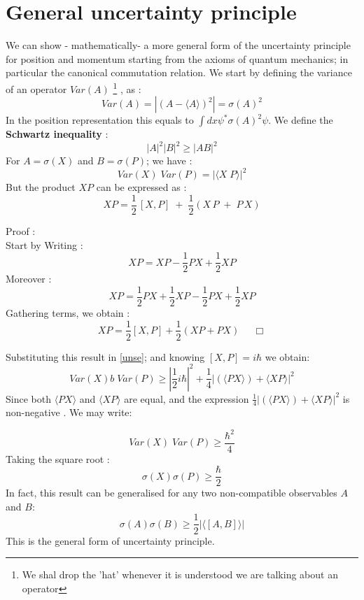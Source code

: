   \section{General uncertainty principle}
  We can show - mathematically- a more general form of the uncertainty principle for position and momentum starting from the axioms of quantum mechanics; in particular the canonical commutation relation. 
  We start by defining the variance of an operator $ Var(A)$ \footnote{ We shal drop the 'hat' whenever it is understood we are talking about an operator} , as :
  \begin{equation}
  Var(A) = |(A- \langle A\rangle)^2| = \sigma(A)^2
  \end{equation}
  In the position representation this equals to $ \int dx \psi^*  \sigma(A)^2 \psi $. We define the \textbf{Schwartz inequality }:
  \begin{equation}
  |A|^2 | B|^2 \geq | AB| ^2
  \end{equation}
  For $ A = \sigma(X)$ and $ B= \sigma(P)$; we have :
  \begin{equation}
  Var(X)\; Var(P) = | \langle X\; P \rangle | ^2
  \label{unse}
  \end{equation}
  But the product $ XP$ can be expressed as :
  \begin{equation}
  XP =  \frac{1}{2}\,[ X, P]\; +\;\frac{1}{2} \left( X\,P\;+\;P\,X\right) 
  \end{equation}
 
  \begin{mdframed}
  	Proof :\\
  	Start by Writing :
  	\[
  	XP = XP - \frac{1}{2} PX + \frac{1}{2} XP
  	\]
  	Moreover :
  	\[
  	XP = \frac{1}{2} PX + \frac{1}{2} XP - \frac{1}{2} PX + \frac{1}{2} XP
  	\]
  	Gathering terms, we obtain :
  	\[
  	XP =  \frac{1}{2}[ X, P] +\frac{1}{2} ( XP+PX) \; \; \; \; \; \Box
  	\]
  \end{mdframed}
  Substituting this result in \eqref{unse}; and knowing $ [ X, P]= i \hbar$ we obtain:
  \begin{equation}
  Var(X )b \; Var(P) \geq |\frac{1}{2} i\hbar| ^2 +  \frac{1}{4} | (\langle PX\rangle) +\langle XP\rangle | ^2 
  \end{equation}
  Since both $\langle PX\rangle$ and $\langle XP\rangle$ are equal, and the expression $ \frac{1}{4} | (\langle PX\rangle) +\langle XP\rangle | ^2 $ is non-negative . We may write:
  
  \begin{equation}
  Var(X) \; Var(P) \geq \frac{\hbar ^2}{4}
  \end{equation}
  Taking the square root :
  \begin{equation}
  \boxed {\sigma(X) \sigma(P) \geq \frac{\hbar}{2} }
  \end{equation}
  In fact, this result can be generalised for any two non-compatible observables $A$ and $B$:
  \begin{equation}
  \boxed {\sigma(A) \sigma(B) \geq \frac{1}{2} |\langle [ A, B]\rangle |}
  \end{equation}
  This is the general form of uncertainty principle. 
